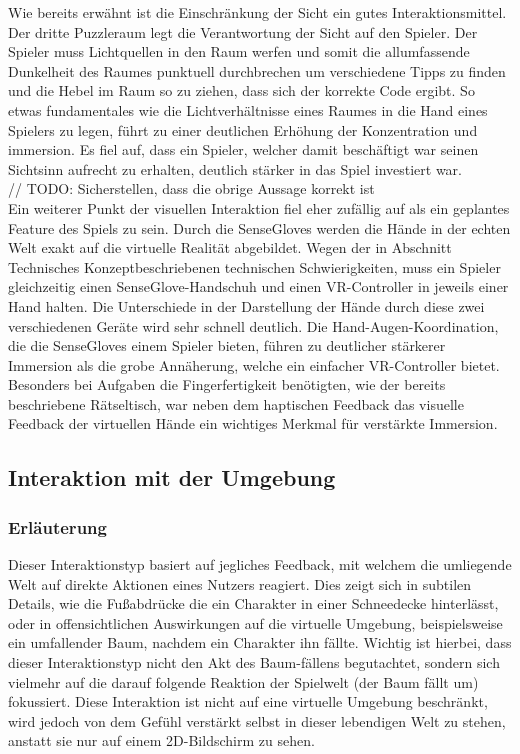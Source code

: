 Wie bereits erwähnt ist die Einschränkung der Sicht ein gutes Interaktionsmittel. Der dritte Puzzleraum legt die Verantwortung der Sicht auf den Spieler. Der Spieler muss Lichtquellen in den Raum werfen und somit die allumfassende Dunkelheit des Raumes punktuell durchbrechen um verschiedene Tipps zu finden und die Hebel im Raum so zu ziehen, dass sich der korrekte Code ergibt. So etwas fundamentales wie die Lichtverhältnisse eines Raumes in die Hand eines Spielers zu legen, führt zu einer deutlichen Erhöhung der Konzentration und immersion. Es fiel auf, dass ein Spieler, welcher damit beschäftigt war seinen Sichtsinn aufrecht zu erhalten, deutlich stärker in das Spiel investiert war.\\

// TODO: Sicherstellen, dass die obrige Aussage korrekt ist\\

Ein weiterer Punkt der visuellen Interaktion fiel eher zufällig auf als ein geplantes Feature des Spiels zu sein. Durch die SenseGloves werden die Hände in der echten Welt exakt auf die virtuelle Realität abgebildet. Wegen der in Abschnitt \dq Technisches Konzept\dq beschriebenen technischen Schwierigkeiten, muss ein Spieler gleichzeitig einen SenseGlove-Handschuh und einen VR-Controller in jeweils einer Hand halten. Die Unterschiede in der Darstellung der Hände durch diese zwei verschiedenen Geräte wird sehr schnell deutlich. Die Hand-Augen-Koordination, die die SenseGloves einem Spieler bieten, führen zu deutlicher stärkerer Immersion als die grobe Annäherung, welche ein einfacher VR-Controller bietet. Besonders bei Aufgaben die Fingerfertigkeit benötigten, wie der bereits beschriebene Rätseltisch, war neben dem haptischen Feedback das visuelle Feedback der virtuellen Hände ein wichtiges Merkmal für verstärkte Immersion.

\subsection{Interaktion mit der Umgebung}
\subsubsection{Erläuterung}
Dieser Interaktionstyp basiert auf jegliches Feedback, mit welchem die umliegende Welt auf direkte Aktionen eines Nutzers reagiert. Dies zeigt sich in subtilen Details, wie die Fußabdrücke die ein Charakter in einer Schneedecke hinterlässt, oder in offensichtlichen Auswirkungen auf die virtuelle Umgebung, beispielsweise ein umfallender Baum, nachdem ein Charakter ihn fällte. Wichtig ist hierbei, dass dieser Interaktionstyp nicht den Akt des Baum-fällens begutachtet, sondern sich vielmehr auf die darauf folgende Reaktion der Spielwelt (der Baum fällt um) fokussiert. Diese Interaktion ist nicht auf eine virtuelle Umgebung beschränkt, wird jedoch von dem Gefühl verstärkt selbst in dieser lebendigen Welt zu stehen, anstatt sie nur auf einem 2D-Bildschirm zu sehen.

